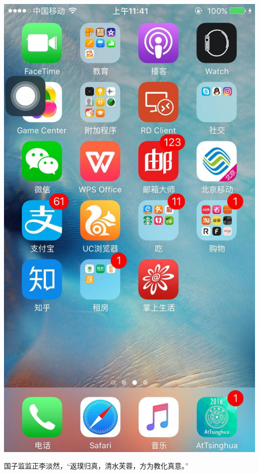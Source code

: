 \documentclass[12pt, a4paper]{book}
\begin{document}
\begin{CJK}{UTF8}{gbsn}
    \includegraphics[height=0.3\textheight]{./figure/desktop-5.jpg}

    国子监监正李淡然，“返璞归真，清水芙蓉，方为教化真意。”


\end{CJK}
\end{document}
